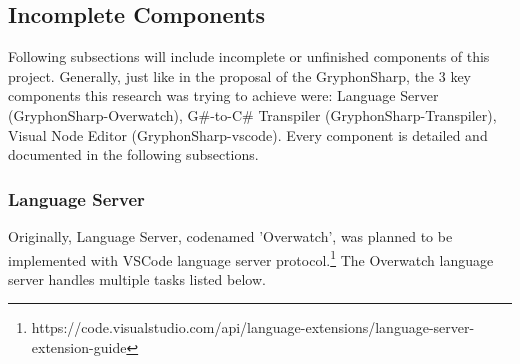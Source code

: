 \documentclass{article}
\begin{document}
\subsection{Incomplete Components}
Following subsections will include incomplete or unfinished components of this project. Generally, just like in the proposal of the GryphonSharp, the 3 key components this research was trying to achieve were: Language Server (GryphonSharp-Overwatch), G\#-to-C\# Transpiler (GryphonSharp-Transpiler), Visual Node Editor (GryphonSharp-vscode). Every component is detailed and documented in the following subsections.

\subsubsection{Language Server}
Originally, Language Server, codenamed 'Overwatch', was planned to be implemented with VSCode language server protocol.\footnote{https://code.visualstudio.com/api/language-extensions/language-server-extension-guide}
The Overwatch language server handles multiple tasks listed below.
\end{document}
